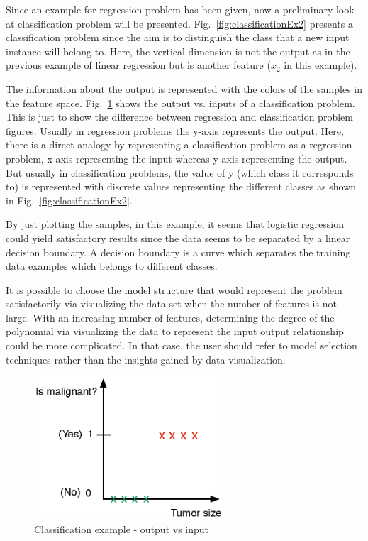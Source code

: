 Since an example for regression problem has been given, now a preliminary look at classification problem will be presented. 
Fig.~\ref{fig:classificationEx2} presents a classification problem since the aim is to distinguish the class that a new input instance will belong to. 
Here, the vertical dimension is not the output as in the previous example of linear regression but is another feature ($x_2$ in this example). 

The information about the output is represented with the colors of the samples in the feature space.
Fig.~\ref{fig:classificationEx1} shows the output vs. inputs of a classification problem. 
This is just to show the difference between regression and classification problem figures. 
Usually in regression problems the y-axis represents the output. 
Here, there is a direct analogy by representing a classification problem as a regression problem, x-axis representing the input whereas y-axis representing the output. 
But usually in classification problems, the value of y (which class it corresponds to) is represented with discrete values representing the different classes as shown in Fig.~\ref{fig:classificationEx2}.

By just plotting the samples, in this example, it seems that logistic regression could yield satisfactory results since the data seems to be separated by a linear decision boundary. 
A decision boundary is a curve which separates the training data examples which belongs to different classes. 

It is possible to choose the model structure that would represent the problem satisfactorily via visualizing the data set when the number of features is not large.
With an increasing number of features, determining the degree of the polynomial via visualizing the data to represent the input output relationship could be more complicated. 
In that case, the user should refer to model selection techniques rather than the insights gained by data visualization. 


\begin{figure}
\begin{center}
\includegraphics[width=7cm]{figures/classificationEx1}    %
\caption{Classification example - output vs input} 
\label{fig:classificationEx1}
\end{center}
\end{figure}

